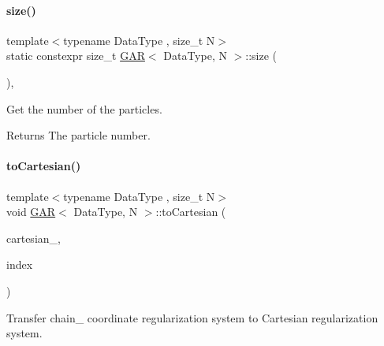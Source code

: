 \paragraph{\texorpdfstring{size()}{size()}}
{\footnotesize\ttfamily template$<$typename Data\+Type , size\+\_\+t N$>$ \\
static constexpr size\+\_\+t \mbox{\hyperlink{class_g_a_r}{G\+AR}}$<$ Data\+Type, N $>$\+::size (\begin{DoxyParamCaption}{ }\end{DoxyParamCaption})\hspace{0.3cm}{\ttfamily [inline]}, {\ttfamily [static]}}



Get the number of the particles. 

\begin{DoxyReturn}{Returns}
The particle number. 
\end{DoxyReturn}
\mbox{\label{class_g_a_r_a2a282218e90ffb1a367da364b70e54a3}} 
\paragraph{\texorpdfstring{to\+Cartesian()}{toCartesian()}}
{\footnotesize\ttfamily template$<$typename Data\+Type , size\+\_\+t N$>$ \\
void \mbox{\hyperlink{class_g_a_r}{G\+AR}}$<$ Data\+Type, N $>$\+::to\+Cartesian (\begin{DoxyParamCaption}\item[{\mbox{\hyperlink{class_g_a_r}{G\+AR}}$<$ Data\+Type, N $>$ \&}]{cartesian_,  }\item[{\mbox{\hyperlink{class_g_a_r_aaf033049c0cd8f0f86a82b9595086fa5}{Index\+Array}} \&}]{index }\end{DoxyParamCaption})\hspace{0.3cm}{\ttfamily [inline]}}



Transfer chain_ coordinate regularization system to Cartesian regularization system.

